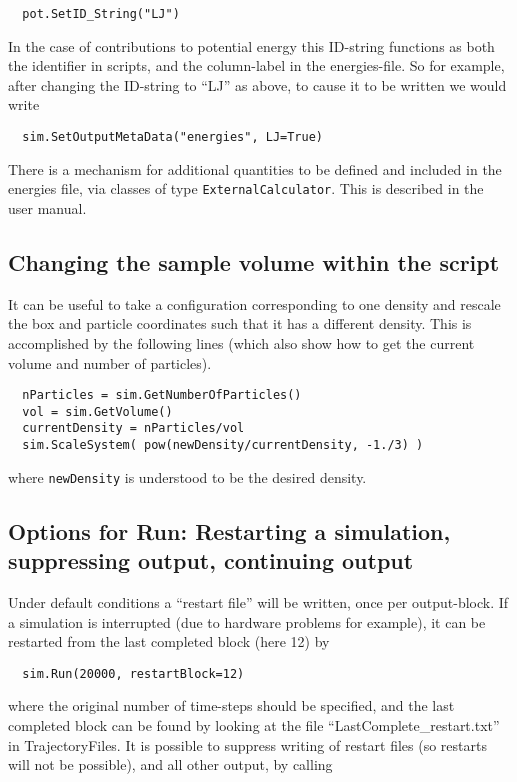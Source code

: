 \begin{verbatim}
  pot.SetID_String("LJ")
\end{verbatim}
In the case of contributions to potential energy this ID-string functions as
both the identifier in scripts, and the column-label in the energies-file.
So for example, after changing the ID-string to ``LJ'' as above, to cause it 
to be written we would write

\begin{verbatim}
  sim.SetOutputMetaData("energies", LJ=True)
\end{verbatim}
There is a mechanism for additional quantities to be defined and included in
the energies file, via classes of type \verb|ExternalCalculator|. This is
described in the user manual.

\subsection{Changing the sample volume within the script}

It can be useful to take a configuration corresponding to one density and
rescale the box and particle coordinates such that it has a different density.
This is accomplished by the following lines (which also show how to get the
current volume and number of particles).

\begin{verbatim}
  nParticles = sim.GetNumberOfParticles()
  vol = sim.GetVolume()
  currentDensity = nParticles/vol
  sim.ScaleSystem( pow(newDensity/currentDensity, -1./3) )
\end{verbatim}
where \verb|newDensity| is understood to be the desired density.

\subsection{Options for Run: Restarting a simulation, 
suppressing output, continuing output}

Under default conditions a ``restart file'' will be written, once per 
output-block. If a simulation is interrupted (due to hardware problems for 
example), it can be restarted from the last completed 
block (here 12) by
 
\begin{verbatim}
  sim.Run(20000, restartBlock=12)
\end{verbatim}
where the original number of time-steps should be specified, and the last
completed block can be found by looking at the file 
``LastComplete\_restart.txt'' in TrajectoryFiles. It is possible to suppress 
writing of restart files (so restarts will not be possible), 
and all other output, by calling

